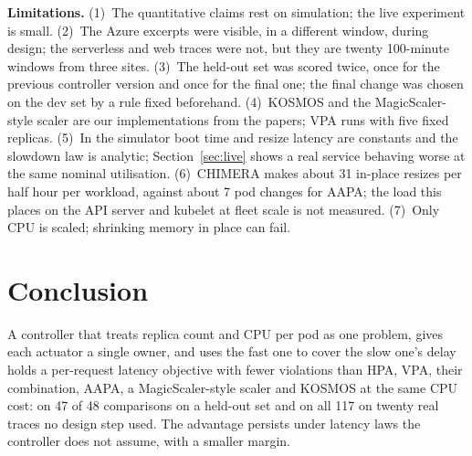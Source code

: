 \documentclass[conference]{IEEEtran}
\begin{document}
\textbf{Limitations.} (1)~The quantitative claims rest on simulation; the live experiment
is small. (2)~The Azure excerpts were visible, in a different window, during design; the
serverless and web traces were not, but they are twenty 100-minute windows from three
sites. (3)~The held-out set was scored twice, once for the previous controller version and
once for the final one; the final change was chosen on the dev set by a rule fixed
beforehand. (4)~KOSMOS and the MagicScaler-style scaler are our implementations from the
papers; VPA runs with five fixed replicas. (5)~In the simulator boot time and resize
latency are constants and the slowdown law is analytic; Section~\ref{sec:live} shows a real
service behaving worse at the same nominal utilisation. (6)~CHIMERA makes about 31 in-place
resizes per half hour per workload, against about 7 pod changes for AAPA; the load this
places on the API server and kubelet at fleet scale is not measured. (7)~Only CPU is
scaled; shrinking memory in place can fail.

\section{Conclusion}

A controller that treats replica count and CPU per pod as one problem, gives each actuator
a single owner, and uses the fast one to cover the slow one's delay holds a per-request
latency objective with fewer violations than HPA, VPA, their combination, AAPA, a
MagicScaler-style scaler and KOSMOS at the same CPU cost: on 47 of 48 comparisons on a
held-out set and on all 117 on twenty real traces no design step used. The advantage
persists under latency laws the controller does not assume, with a smaller margin.
\ReplayConclusion
\end{document}
